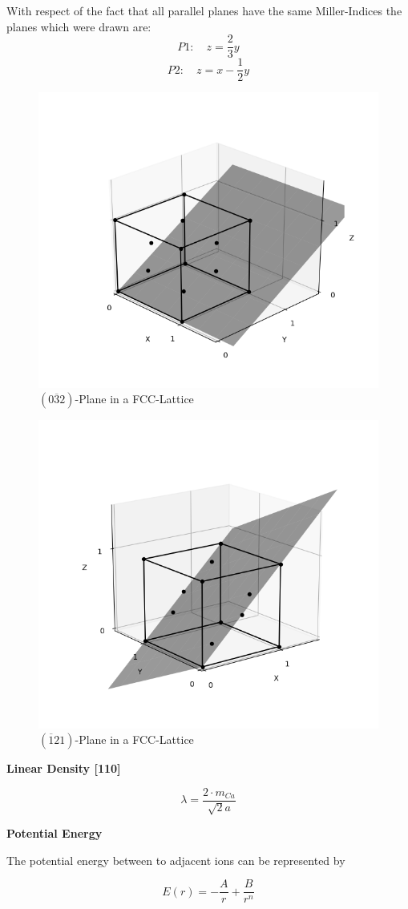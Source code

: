 With respect of the fact that all parallel planes have the same Miller-Indices the planes which were drawn are:
$$P1: \quad z = \frac{2}{3}y$$
$$P2: \quad z = x -\frac{1}{2}y$$

\begin{figure}[H]
	\centering
	\includegraphics[width=0.6\linewidth]{Graphics/Chapter1/PLANE032}
	\caption{$(0\overline{3}2)$-Plane in a FCC-Lattice}
	\label{}
\end{figure}


\begin{figure}[H]
	\centering
	\includegraphics[width=0.6\linewidth]{Graphics/Chapter1/PLANE121}
	\caption{$(\overline{1}21)$-Plane in a FCC-Lattice}
	\label{}
\end{figure}


\textbf{Linear Density [110]}

$$\lambda = \frac{2 \cdot m_{Ca}}{\sqrt{2}a}$$

\textbf{Potential Energy}

The potential energy between to adjacent ions can be represented by

\begin{equation}
	E(r) = - \frac{A}{r} + \frac{B}{r^n}
	\label{eq:Pot_Energy}
\end{equation}

